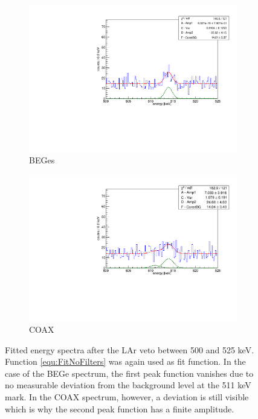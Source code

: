 \documentclass[encoding=utf8,british]{tumphthesis}
\begin{document}
\begin{figure}[t!]
	\centering
	\begin{subfigure}{.5\textwidth}
		\centering
		\includegraphics[width=\textwidth]{./Bilder/500525FitLArVetoBEGes.pdf}
		\caption{BEGes}
		\label{fig:FitLArVetoBEGes}
	\end{subfigure}\hfill%
	\begin{subfigure}{.5\textwidth}
		\centering
		\includegraphics[width=\textwidth]{./Bilder/500525FitLArVetoCOAX.pdf}
		\caption{COAX}
		\label{fig:FitLArVetoCOAX}
	\end{subfigure}
	\caption{
	Fitted energy spectra after the LAr veto between 500 and 525 keV. 
	Function \ref{equ:FitNoFilters} was again used as fit function. 
    In the case of the BEGe spectrum, the first peak function vanishes due to no measurable deviation from the background level at the 511 keV mark.
    In the COAX spectrum, however, a deviation is still visible which is why the second peak function has a finite amplitude.
	}
\end{figure}
\end{document}

